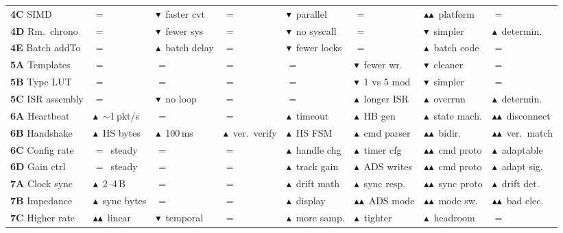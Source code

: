 \documentclass[11pt,a4paper]{article}
\newcommand{\tactic}[1]{\textbf{#1}}
\newcommand{\metricdown}{$\blacktriangledown$}
\newcommand{\metricup}{$\blacktriangle$}
\newcommand{\metriceq}{$=$}
\begin{document}
{\begin{longtable}{|l|C{1.5cm}|C{1.3cm}|C{1.3cm}|C{1.3cm}|C{1.3cm}|C{1.7cm}|C{1.5cm}|}
\tactic{4C} SIMD &
\metriceq &
\metricdown\ faster cvt &
\metriceq &
\metricdown\ parallel &
\metriceq &
\metricup\metricup\ platform &
\metriceq \\

\tactic{4D} Rm.\ chrono &
\metriceq &
\metricdown\ fewer sys &
\metriceq &
\metricdown\ no syscall &
\metriceq &
\metricdown\ simpler &
\metricup\ determin. \\

\tactic{4E} Batch addTo &
\metriceq &
\metricup\ batch delay &
\metriceq &
\metricdown\ fewer locks &
\metriceq &
\metricup\ batch code &
\metriceq \\

\tactic{5A} Templates &
\metriceq &
\metriceq &
\metriceq &
\metriceq &
\metricdown\ fewer wr. &
\metricdown\ cleaner &
\metriceq \\

\tactic{5B} Type LUT &
\metriceq &
\metriceq &
\metriceq &
\metriceq &
\metricdown\ 1 vs 5 mod &
\metricdown\ simpler &
\metriceq \\

\tactic{5C} ISR assembly &
\metriceq &
\metricdown\ no loop &
\metriceq &
\metriceq &
\metricup\ longer ISR &
\metricup\ overrun &
\metricup\ determin. \\

\tactic{6A} Heartbeat &
\metricup\ ${\sim}$1\,pkt/s &
\metriceq &
\metriceq &
\metricup\ timeout &
\metricup\ HB gen &
\metricup\ state mach. &
\metricup\metricup\ disconnect \\

\tactic{6B} Handshake &
\metricup\ HS bytes &
\metricup\ 100\,ms &
\metricup\ ver.\ verify &
\metricup\ HS FSM &
\metricup\ cmd parser &
\metricup\metricup\ bidir. &
\metricup\metricup\ ver.\ match \\

\tactic{6C} Config rate &
\metriceq\ steady &
\metriceq &
\metriceq &
\metricup\ handle chg &
\metricup\ timer cfg &
\metricup\metricup\ cmd proto &
\metricup\ adaptable \\

\tactic{6D} Gain ctrl &
\metriceq\ steady &
\metriceq &
\metriceq &
\metricup\ track gain &
\metricup\ ADS writes &
\metricup\metricup\ cmd proto &
\metricup\ adapt sig. \\

\tactic{7A} Clock sync &
\metricup\ 2--4\,B &
\metriceq &
\metriceq &
\metricup\ drift math &
\metricup\ sync resp. &
\metricup\metricup\ sync proto &
\metricup\ drift det. \\

\tactic{7B} Impedance &
\metricup\ sync bytes &
\metriceq &
\metriceq &
\metricup\ display &
\metricup\metricup\ ADS mode &
\metricup\metricup\ mode sw. &
\metricup\metricup\ bad elec. \\

\tactic{7C} Higher rate &
\metricup\metricup\ linear &
\metricdown\ temporal &
\metriceq &
\metricup\ more samp. &
\metricup\ tighter &
\metricup\ headroom &
\metriceq \\

\end{longtable}
}
\end{document}
